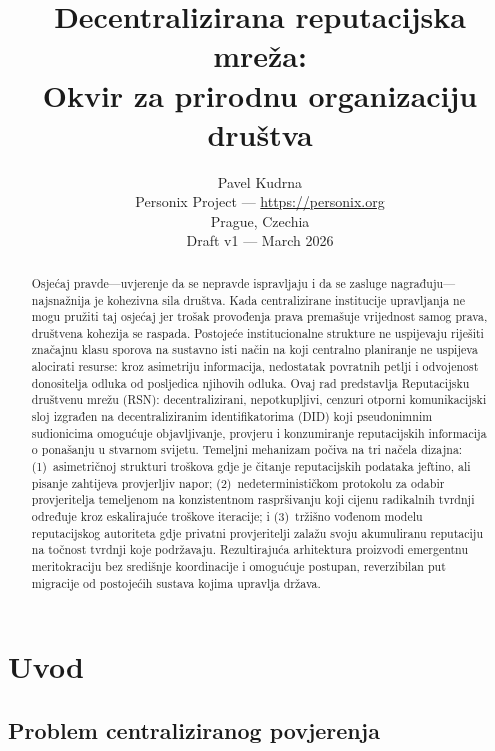 \documentclass[11pt,a4paper,twocolumn]{article}
\title{\textbf{Decentralizirana reputacijska mreža:\\Okvir za prirodnu organizaciju društva}}
\author{Pavel Kudrna\\Personix Project --- \url{https://personix.org}\\Prague, Czechia\\Draft v1 --- March 2026}
\date{}
\begin{document}
\maketitle

\begin{abstract}
Osjećaj pravde---uvjerenje da se nepravde ispravljaju i da se zasluge nagrađuju---najsnažnija je kohezivna sila društva. Kada centralizirane institucije upravljanja ne mogu pružiti taj osjećaj jer trošak provođenja prava premašuje vrijednost samog prava, društvena kohezija se raspada. Postojeće institucionalne strukture ne uspijevaju riješiti značajnu klasu sporova na sustavno isti način na koji centralno planiranje ne uspijeva alocirati resurse: kroz asimetriju informacija, nedostatak povratnih petlji i odvojenost donositelja odluka od posljedica njihovih odluka. Ovaj rad predstavlja Reputacijsku društvenu mrežu (RSN): decentralizirani, nepotkupljivi, cenzuri otporni komunikacijski sloj izgrađen na decentraliziranim identifikatorima (DID) koji pseudonimnim sudionicima omogućuje objavljivanje, provjeru i konzumiranje reputacijskih informacija o ponašanju u stvarnom svijetu. Temeljni mehanizam počiva na tri načela dizajna: (1)~asimetričnoj strukturi troškova gdje je čitanje reputacijskih podataka jeftino, ali pisanje zahtijeva provjerljiv napor; (2)~nedeterminističkom protokolu za odabir provjeritelja temeljenom na konzistentnom raspršivanju koji cijenu radikalnih tvrdnji određuje kroz eskalirajuće troškove iteracije; i (3)~tržišno vođenom modelu reputacijskog autoriteta gdje privatni provjeritelji zalažu svoju akumuliranu reputaciju na točnost tvrdnji koje podržavaju. Rezultirajuća arhitektura proizvodi emergentnu meritokraciju bez središnje koordinacije i omogućuje postupan, reverzibilan put migracije od postojećih sustava kojima upravlja država.
\end{abstract}

\section{Uvod}

\subsection{Problem centraliziranog povjerenja}
\end{document}
